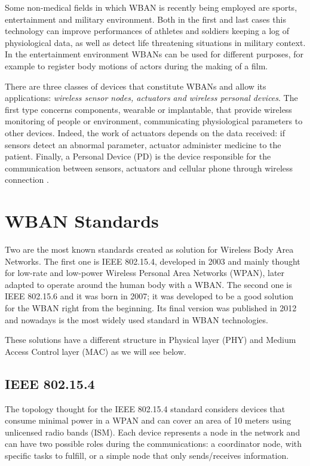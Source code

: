 \documentclass[conference]{IEEEtran}
\begin{document}
Some non-medical fields in which WBAN is recently being employed are sports, entertainment and military environment. Both in the first and last cases this technology can improve performances of athletes and soldiers keeping a log of physiological data, as well as detect life threatening situations in military context. In the entertainment environment WBANs can be used for different purposes, for example to register body motions of actors during the making of a film.

There are three classes of devices that constitute WBANs and allow its applications: \textit{wireless sensor nodes, actuators and wireless personal devices}. The first type concerns components, wearable or implantable, that provide wireless monitoring of people or environment, communicating physiological parameters to other devices. Indeed, the work of actuators depends on the data received: if sensors detect an abnormal parameter, actuator administer medicine to the patient. Finally, a Personal Device (PD) is the device responsible for the communication between sensors, actuators and cellular phone through wireless connection \cite{salayma2017wireless}.


\section{WBAN Standards}
Two are the most known standards created as solution for Wireless Body Area Networks. The first one is IEEE 802.15.4, developed in 2003 and mainly thought for low-rate and low-power Wireless Personal Area Networks (WPAN), later adapted to operate around the human body with a WBAN. The second one is IEEE 802.15.6 and it was born in 2007; it was developed to be a good solution for the WBAN right from the beginning. Its final version was published in 2012 and nowadays is the most widely used standard in WBAN technologies.

These solutions have a different structure in Physical layer (PHY) and Medium Access Control layer (MAC) as we will see below.


\subsection{IEEE 802.15.4}
The topology thought for the IEEE 802.15.4 standard considers devices that consume minimal power in a WPAN and can cover an area of 10 meters using unlicensed radio bands (ISM). Each device represents a node in the network and can have two possible roles during the communications: a coordinator node, with specific tasks to fulfill, or a simple node that only sends/receives information.
\end{document}
